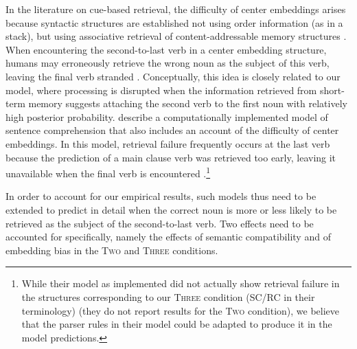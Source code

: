 In the literature on cue-based retrieval, the difficulty of center embeddings arises because syntactic structures are established not using order information (as in a stack), but using associative retrieval of content-addressable memory structures \citep{mcelree-memory-2003,lewis2005activation,parker2017cue}.
When encountering the second-to-last verb in a center embedding structure, humans may erroneously retrieve the wrong noun as the subject of this verb, leaving the final verb stranded \citep{mcelree-memory-2003,lewis2005activation,Haussler2015AnIA}.
Conceptually, this idea is closely related to our model, where processing is disrupted when the information retrieved from short-term memory suggests  attaching the second verb to the first noun with relatively high posterior probability.
\citet{lewis2005activation} describe a computationally implemented model of sentence comprehension that also includes an account of the difficulty of center embeddings.
In this model, retrieval failure frequently occurs at the last verb because the prediction of a main clause verb was retrieved too early, leaving it unavailable when the final verb is encountered \citep[p. 406]{lewis2005activation}.\footnote{While their model as implemented did not actually show retrieval failure in the structures corresponding to our \textsc{Three} condition (SC/RC in their terminology) (they do not report results for the \textsc{Two} condition), we believe that the parser rules in their model could be adapted to produce it in the model predictions. }

In order to account for our empirical results, such models thus need to be extended to predict in detail when the correct noun is more or less likely to be retrieved as the subject of the second-to-last verb.
Two effects need to be accounted for specifically, namely the effects of semantic compatibility and of embedding bias in the \textsc{Two} and \textsc{Three} conditions.

